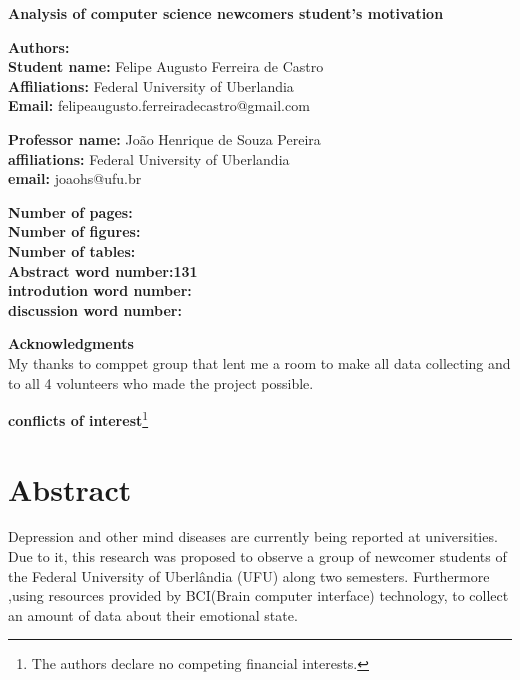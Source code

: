 \documentclass[12pt,openright,a4paper]{article}
\begin{document}
	\linespread{1.5}
 \fontsize{16}{10}\selectfont \centering \textbf{Analysis of computer science newcomers student's motivation} \\
	\fontsize{14}{10}\selectfont {Analysis of student's motivation}\newline

\fontsize{12}{10}
\flushleft
	\textbf{Authors:}\\
	\textbf{Student name:} Felipe Augusto Ferreira de Castro\\
	\textbf{Affiliations:} Federal University of Uberlandia\\
	\textbf{Email:} felipeaugusto.ferreiradecastro@gmail.com \newline
	
\textbf{Professor name:} João Henrique de Souza Pereira\\
\textbf{affiliations:} Federal University of Uberlandia\\
\textbf{email:} joaohs@ufu.br\newline

\textbf{Number of pages:}\\
\textbf{Number of figures:}\\
\textbf{Number of tables:}\\
\textbf{Abstract word number:131}\\
\textbf{introdution word number:}\\
\textbf{discussion word number:}\newline
	
\textbf{Acknowledgments}\\	
My thanks to comppet group that lent me a room to make all data collecting and to all 4 volunteers who made the project possible.\newline

\textbf{conflicts of interest}\footnote{The authors declare no competing financial interests.}

\newpage
\tableofcontents
\newpage
\section{Abstract}
Depression and other mind diseases are currently being reported at universities. Due to it, this research was proposed to observe a group of newcomer students of the Federal University of Uberlândia (UFU) along two semesters. Furthermore ,using resources provided by BCI(Brain computer interface)  technology, to collect an amount of data about their emotional state.
\end{document}

